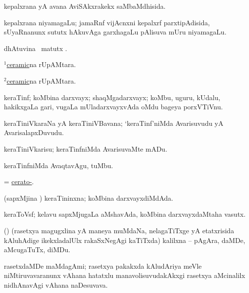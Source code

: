 \bentry
{}
\gl{\gu}
\bmng
kepalxrana yA avana AviSAkxrakekx saMbaMdhisida. 
\emng
\eentry

\bentry
{}
\gl{\nA}
\bmng
kepalxrana niyamagaLu; jamaRnf vijAcnxni kepalxrf  parxtipAdisida, sUyaRnanunx sututx hAkuvAga garxhagaLu pAlisuva mUru niyamagaLu. 
\emng
\eentry

\bentry
{}
\gl{\kirx}
\bmng
{} dhAtuvina \BU\ matutx \BUkaq. 
\emng
\eentry

\bentry
{}
\gl{\gu}
\bmng
\hyperref{kandict_c.pdf}{C}{ceramic(1)}{$^1$ceramic}na rUpAMtara. 
\emng
\eentry

\bentry
{}
\gl{\nA}
\bmng
\hyperref{kandict_c.pdf}{C}{ceramic(2)}{$^2$ceramic}na rUpAMtara. 
\emng
\eentry

\bentry
{}
\gl{\nA}
\bmng
keraTinf; koMbina darxvayx; shaqMgadarxvayx; koMbu, uguru, kUdalu, hakikxgaLa gari, \mo vugaLa mUladarxvayxvAda oMdu bageya porxVTiVnu. 
\emng
\eentry

\bentry
{}
\gl{\nA}
\bmng
keraTiniVkaraNa yA keraTiniVBavana; `keraTinf'niMda Avarisuvudu yA AvarisalapxDuvudu. 
\emng
\eentry

\bentry
{}
\gl{\sakirx}
\bmng
keraTiniVkarisu; keraTinfniMda AvarisuvaMte mADu. 
\emng

\noindent
\gl{\akirx}
\bmng
keraTinfniMda AvaqtavAgu, tuMbu. 
\emng
\eentry

\bentry
{}
\gl{\sapUpa}
\bmng
= \hyperref{kandict_c.pdf}{C}{cerato-}{cerato-}. 
\emng
\eentry

\bentry
{}
\gl{\gu}
\bmng
(sapxMjina \vi) keraTininxna; koMbina darxvayxdiMdAda. 
\emng
\eentry

\bentry
{}
\gl{\nA}
\bmng
keraToVsf; kelavu sapxMjugaLa aMshavAda, koMbina darxvayxdaMtaha vasutx. 
\emng
\eentry

\bentry
{}
\gl{\nA}
\bmng
(\birx) (rasetxya magugxlina yA maneya muMdaNa, nelagaTiTxge yA etatxrisida kAluhAdige ikekxladalUlx rakaSxNegAgi kaTiTxda) kalilxna -- pAgAra, daMDe, aMcugaTuTx, diMDu. 
\emng
\eentry

\bentry
{}
\gl{\nA}
\bmng
rasetxdaMDe maMdagAmi; rasetxya pakakxda kAludAriya meVle niMtiruvavaranunx vAhana hatatxlu manavolisuvudakAkxgi rasetxya aMcinalilx nidhAnavAgi vAhana naDesuvava. 
\emng
\eentry

